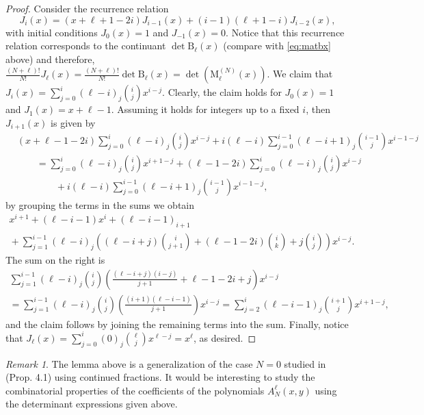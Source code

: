 \documentclass[11pt]{article}
\numberwithin{equation}{section}
\newcommand{\MatSymbol}[1]{\bm{\mathrm{#1}}}
\newcommand{\mB}{\MatSymbol{B}}
\newcommand{\mM}{\MatSymbol{M}}
\theoremstyle{plain}
\theoremstyle{definition}
\theoremstyle{remark}
\newtheorem{rem}{Remark}[section]
\begin{document}
\begin{proof}
  Consider the recurrence relation
  \[
    J_i(x) =  (x+ \ell + 1 - 2 i) J_{i-1}(x) + (i-1)(\ell+1-i) J_{i-2}(x),
  \]
  with initial conditions $J_0(x) = 1$ and \(J_{-1}(x) = 0 \). Notice that this
  recurrence relation corresponds to the continuant \(\det \mB_{\ell}(x)\) (compare with \eqref{eq:matbx} above)
  and therefore, \(\frac{(N+\ell)!}{N!} J_\ell (x) = \frac{(N+\ell)!}{N!} \det \mB_{\ell}(x) = \det(\mM^{(N)}_\ell(x)) \).
  We claim that \(J_i(x) = \sum_{j=0}^i (\ell-i)_j \binom{i}{j} x^{i-j} \). Clearly, the claim holds
  for \(J_0(x) = 1 \) and \(J_1(x) = x + \ell -1 \). Assuming it holds for integers up to a fixed \(i\), then
  \(J_{i+1}(x)\) is given by
  \begin{align*}
    &(x + \ell - 1- 2 i) \sum_{j=0}^{i} (\ell-i)_j \binom{i}{j} x^{i-j} + i(\ell - i) \sum_{j=0}^{i-1} (\ell -i + 1)_j \binom{i-1}{j} x^{i-1-j} \\
    &\qquad=  \sum_{j=0}^{i} (\ell-i)_j \binom{i}{j} x^{i+1-j} + (\ell - 1- 2 i) \sum_{j=0}^{i} (\ell-i)_j \binom{i}{j} x^{i-j} \\
    &\qquad \qquad{}+ i(\ell - i) \sum_{j=0}^{i-1} (\ell -i + 1)_j \binom{i-1}{j} x^{i-1-j},
  \end{align*}
  by grouping the terms in the sums we obtain
  \begin{multline*}
    x^{i+1} + (\ell -i -1) x^i + (\ell-i -1)_{i+1} \\
    {} + \sum_{j=1}^{i-1} (\ell-i)_j \left( (\ell-i+j) \binom{i}{j+1} + (\ell-1-2 i)\binom{i}{k} + j \binom{i}{j} \right) x^{i-j}.
  \end{multline*}
  The sum on the right is
  \begin{multline*}
    \sum_{j=1}^{i-1} (\ell-i)_j \binom{i}{j} \left( \frac{(\ell-i+j)(i-j)}{j+1} + \ell -1 - 2 i + j \right)  x^{i-j} \\
    =  \sum_{j=1}^{i-1} (\ell-i)_j \binom{i}{j} \left(\frac{(i+1)(\ell -i -1)}{j+1}\right) x^{i-j}
    =  \sum_{j=2}^{i} (\ell -i - 1)_j \binom{i+1}{j} x^{i+1-j},
  \end{multline*}
  and the claim follows by joining the remaining terms into the sum. Finally, notice that
  \(J_\ell (x) = \sum_{j=0}^i (0)_j \binom{\ell}{j} x^{\ell-j} = x^\ell \), as desired. 
\end{proof}

\begin{rem}
  The lemma above is a generalization of the case \(N = 0 \) studied in \cite{RW2017} (Prop. 4.1) using
  continued fractions. It would be interesting to study the combinatorial properties of the coefficients of the polynomials $A_N^{\ell}(x,y)$
  using the determinant expressions given above.
\end{rem}
\end{document}
